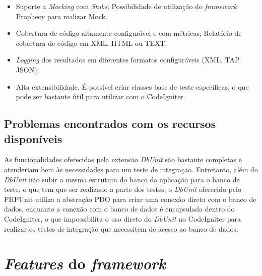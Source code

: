 \begin{itemize}
      \item Suporte a \textit{Mocking} com \textit{Stubs};
	\subitem Possibilidade de utilização do \textit{framework} Prophecy \footnotemark para realizar Mock.
	
      \item Cobertura de código altamente configurável e com métricas;
	 \subitem Relatório de cobertura de código em XML, HTML ou TEXT.
      
      \item \textit{Logging} dos resultados em diferentes formatos configuráveis (XML, TAP, JSON);
      
      \item Alta extensibilidade.
	\subitem É possível criar classes base de teste específicas, o que pode ser bastante útil para utilizar com o CodeIgniter.
    \end{itemize}
    
  \subsection{Problemas encontrados com os recursos disponíveis}
    
    As funcionalidades oferecidas pela extensão \textit{DbUnit} são bastante completas e atenderiam bem às necessidades
    para um teste de integração.
    Entretanto, além do \textit{DbUnit} não subir a mesma estrutura do banco da aplicação para o banco de teste,
    o que tem que ser realizado a parte dos testes, o \textit{DbUnit} oferecido pelo PHPUnit utiliza a abstração PDO para
    criar uma conexão direta com o banco de dados, enquanto a conexão com o banco de dados é encapsulada dentro do CodeIgniter,
    o que impossibilita o uso direto do \textit{DbUnit} no CodeIgniter para realizar os testes de integração que necessitem de
    acesso ao banco de dados.
    
\section{\textit{Features} do \textit{framework}}

